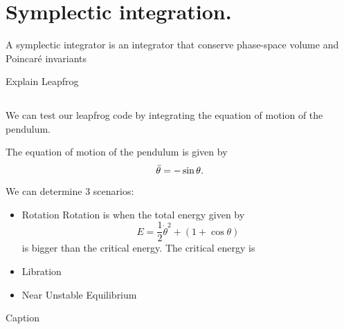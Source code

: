 \section{Symplectic integration.}

A symplectic integrator is an integrator that conserve phase-space volume and Poincar\' e invariants \cite{BinneyT_}

Explain Leapfrog 





\subsection{}
We can test our leapfrog code by integrating the equation of motion of the pendulum. 

The equation of motion of the pendulum is given by
\begin{equation}
    \Ddot{\theta}=-\sin\theta.
\end{equation}

We can determine 3 scenarios:
\begin{itemize}
    \item Rotation
    Rotation is when the total energy given by
    \begin{equation}
    E=\frac{1}{2}\Dot{\theta}^2+\left(1+\cos\theta\right)
    \end{equation}
    is bigger than the critical energy. The critical energy is 
    
    \item Libration
    \item Near Unstable Equilibrium
\end{itemize}

\begin{table}[]
    \centering

    \caption{Caption}
    \label{tab:PendulumIV}
\end{table}



